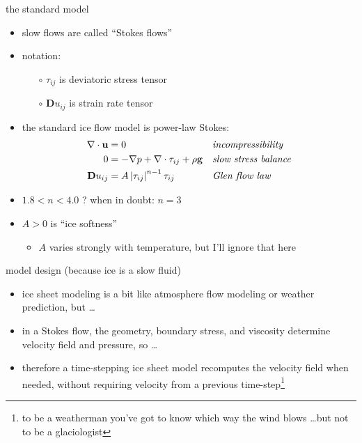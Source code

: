 \documentclass[hide notes,intlimits]{beamer}
\begin{document}
\begin{frame}{the standard model}

\begin{itemize}
\item slow flows are called ``Stokes flows''
\item notation:
  \begin{itemize}
  \item[$\circ$] $\tau_{ij}$ is deviatoric stress tensor
  \item[$\circ$] $\mathbf{D}u_{ij}$ is strain rate tensor
  \end{itemize}
\smallskip
\item the standard ice flow model is power-law Stokes:
\begin{align*}
\nabla \cdot \mathbf{u} &= 0 &&\text{\emph{incompressibility}} \\
0 &= - \nabla p + \nabla \cdot \tau_{ij} + \rho \mathbf{g} &&\text{\emph{slow stress balance}} \\
\mathbf{D}u_{ij} &= A \left|\tau_{ij}\right|^{n-1} \tau_{ij} &&\text{\emph{Glen flow law}}
\end{align*}
\item $1.8 < n < 4.0$ ?  \quad \alert{when in doubt: $n=3$}
\medskip
\item $A>0$ is ``ice softness''
   \begin{itemize}
   \item $A$ varies strongly with temperature, but I'll ignore that here
   \end{itemize}
\end{itemize}
\end{frame}


\begin{frame}{model design (because ice is a slow fluid)}

\begin{itemize}
\item ice sheet modeling is a bit like atmosphere flow modeling or weather prediction, but \dots
\item in a Stokes flow, the geometry, boundary stress, and viscosity determine velocity field and pressure, so \dots
\item therefore a time-stepping ice sheet model recomputes the velocity field when needed, without requiring velocity from a previous time-step\footnote{to be a weatherman you've got to know which way the wind blows \dots but not to be a glaciologist}
\end{itemize}
\end{frame}
\end{document}
